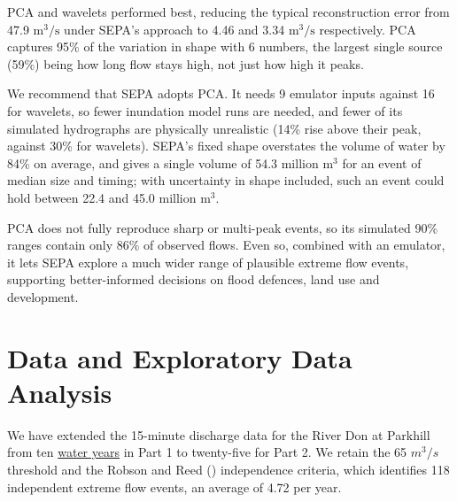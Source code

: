 \documentclass[
  11pt,
  a4paper]{article}
\begin{document}
PCA and wavelets performed best, reducing the typical reconstruction error from 47.9 \(\text{m}^3/\text{s}\) under SEPA's approach to 4.46 and 3.34 \(\text{m}^3/\text{s}\) respectively. PCA captures 95\% of the variation in shape with 6 numbers, the largest single source (59\%) being how long flow stays high, not just how high it peaks.

We recommend that SEPA adopts PCA. It needs 9 emulator inputs against 16 for wavelets, so fewer inundation model runs are needed, and fewer of its simulated hydrographs are physically unrealistic (14\% rise above their peak, against 30\% for wavelets). SEPA's fixed shape overstates the volume of water by 84\% on average, and gives a single volume of 54.3 million \(\text{m}^3\) for an event of median size and timing; with uncertainty in shape included, such an event could hold between 22.4 and 45.0 million \(\text{m}^3\).

PCA does not fully reproduce sharp or multi-peak events, so its simulated 90\% ranges contain only 86\% of observed flows. Even so, combined with an emulator, it lets SEPA explore a much wider range of plausible extreme flow events, supporting better-informed decisions on flood defences, land use and development.

\section{Data and Exploratory Data Analysis}\label{initial-analysis}

We have extended the 15-minute discharge data for the River Don at Parkhill from ten \href{https://en.wikipedia.org/wiki/Water_year}{water years} in Part 1 to twenty-five for Part 2. We retain the 65 \(m^3/s\) threshold and the Robson and Reed () independence criteria, which identifies 118 independent extreme flow events, an average of 4.72 per year.
\end{document}
